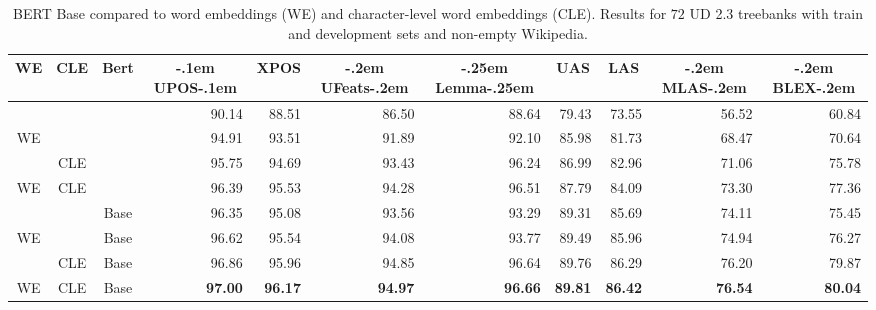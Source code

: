 \documentclass[11pt,a4paper]{article}
\begin{document}
\begin{table*}[t]
  \begin{center}
\begin{tabular}{c|c|c||r|r|r|r|r|r|r|r}
\multicolumn{1}{c|}{WE} & \multicolumn{1}{c|}{CLE} & \multicolumn{1}{c||}{Bert} & \multicolumn{1}{c|}{\kern-.1em UPOS\kern-.1em} & \multicolumn{1}{c|}{XPOS} & \multicolumn{1}{c|}{\kern-.2em UFeats\kern-.2em} & \multicolumn{1}{c|}{\kern-.25em Lemma\kern-.25em} & \multicolumn{1}{c|}{UAS} & \multicolumn{1}{c|}{LAS} & \multicolumn{1}{c|}{\kern-.2em MLAS\kern-.2em} & \multicolumn{1}{c}{\kern-.2em BLEX\kern-.2em}\\\hline\hline
 &  &  & 90.14 & 88.51 & 86.50 & 88.64 & 79.43 & 73.55 & 56.52 & 60.84\\\hline
WE &  &  & 94.91 & 93.51 & 91.89 & 92.10 & 85.98 & 81.73 & 68.47 & 70.64\\\hline
 & CLE &  & 95.75 & 94.69 & 93.43 & 96.24 & 86.99 & 82.96 & 71.06 & 75.78\\\hline
WE & CLE &  & 96.39 & 95.53 & 94.28 & 96.51 & 87.79 & 84.09 & 73.30 & 77.36\\\hline
 &  & Base & 96.35 & 95.08 & 93.56 & 93.29 & 89.31 & 85.69 & 74.11 & 75.45\\\hline
WE &  & Base & 96.62 & 95.54 & 94.08 & 93.77 & 89.49 & 85.96 & 74.94 & 76.27\\\hline
 & CLE & Base & 96.86 & 95.96 & 94.85 & 96.64 & 89.76 & 86.29 & 76.20 & 79.87\\\hline
WE & CLE & Base & \bf 97.00 & \bf 96.17 & \bf 94.97 & \bf 96.66 & \bf 89.81 & \bf 86.42 & \bf 76.54 & \bf 80.04\\\hline
\end{tabular}
   \end{center}
  \caption{BERT Base compared to word embeddings (WE) and character-level word
  embeddings (CLE). Results for $72$ UD 2.3 treebanks with train and development sets
  and non-empty Wikipedia.}
  \label{table:bert}
\end{table*}
\end{document}
